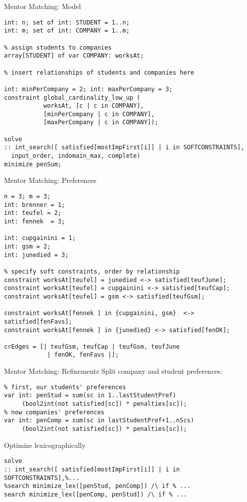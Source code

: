 \documentclass[10pt,xcolor={dvipsnames},fleqn]{beamer}
\begin{document}
\begin{frame}[fragile]{Mentor Matching: Model}
\begin{lstlisting}
int: n; set of int: STUDENT = 1..n;
int: m; set of int: COMPANY = 1..m;

% assign students to companies
array[STUDENT] of var COMPANY: worksAt;

% insert relationships of students and companies here

int: minPerCompany = 2; int: maxPerCompany = 3;
constraint global_cardinality_low_up ( 
           worksAt, [c | c in COMPANY], 
           [minPerCompany | c in COMPANY], 
           [maxPerCompany | c in COMPANY]); 
           
solve 
:: int_search([ satisfied[mostImpFirst[i]] | i in SOFTCONSTRAINTS], 
  input_order, indomain_max, complete)
minimize penSum;
\end{lstlisting}
\end{frame}

\begin{frame}[fragile]{Mentor Matching: Preferences}
\begin{lstlisting}
n = 3; m = 3;
int: brenner = 1;
int: teufel = 2;
int: fennek  = 3;

int: cupgainini = 1;
int: gsm = 2;
int: junedied = 3;

% specify soft constraints, order by relationship
constraint worksAt[teufel] = junedied <-> satisfied[teufJune];
constraint worksAt[teufel] = cupgainini <-> satisfied[teufCap];
constraint worksAt[teufel] = gsm <-> satisfied[teufGsm];

constraint worksAt[fennek ] in {cupgainini, gsm}  <-> satisfied[fenFavs];
constraint worksAt[fennek ] in {junedied} <-> satisfied[fenOK];

crEdges = [| teufGsm, teufCap | teufGsm, teufJune 
            | fenOK, fenFavs |];
\end{lstlisting}
\end{frame}

\begin{frame}[fragile]{Mentor Matching: Refinements}
Split company and student preferences:
\begin{lstlisting}
% first, our students' preferences
var int: penStud = sum(sc in 1..lastStudentPref) 
     (bool2int(not satisfied[sc]) * penalties[sc]);
% now companies' preferences
var int: penComp = sum(sc in lastStudentPref+1..nScs)
     (bool2int(not satisfied[sc]) * penalties[sc]);
\end{lstlisting}

\vspace*{3ex}

Optimize lexicographically

\begin{lstlisting}
solve 
:: int_search([ satisfied[mostImpFirst[i]] | i in SOFTCONSTRAINTS],%... 
%search minimize_lex([penStud, penComp]) /\ if % ...
search minimize_lex([penComp, penStud]) /\ if % ...
\end{lstlisting}
\end{frame}
\end{document}
